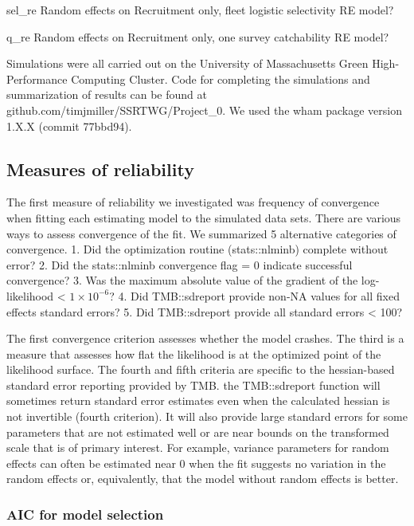 \documentclass[
  12pt,
]{article}
\begin{document}
sel\_re Random effects on Recruitment only, fleet logistic selectivity
RE model?

q\_re Random effects on Recruitment only, one survey catchability RE
model?

Simulations were all carried out on the University of Massachusetts
Green High-Performance Computing Cluster. Code for completing the
simulations and summarization of results can be found at
github.com/timjmiller/SSRTWG/Project\_0. We used the wham package
version 1.X.X (commit 77bbd94).

\hypertarget{measures-of-reliability}{%
\subsection*{Measures of reliability}\label{measures-of-reliability}}

The first measure of reliability we investigated was frequency of
convergence when fitting each estimating model to the simulated data
sets. There are various ways to assess convergence of the fit. We
summarized 5 alternative categories of convergence. 1. Did the
optimization routine (stats::nlminb) complete without error? 2. Did the
stats::nlminb convergence flag = 0 indicate successful convergence? 3.
Was the maximum absolute value of the gradient of the log-likelihood
\textless{} \(1\times10^{-6}\)? 4. Did TMB::sdreport provide non-NA
values for all fixed effects standard errors? 5. Did TMB::sdreport
provide all standard errors \textless{} 100?

The first convergence criterion assesses whether the model crashes. The
third is a measure that assesses how flat the likelihood is at the
optimized point of the likelihood surface. The fourth and fifth criteria
are specific to the hessian-based standard error reporting provided by
TMB. the TMB::sdreport function will sometimes return standard error
estimates even when the calculated hessian is not invertible (fourth
criterion). It will also provide large standard errors for some
parameters that are not estimated well or are near bounds on the
transformed scale that is of primary interest. For example, variance
parameters for random effects can often be estimated near 0 when the fit
suggests no variation in the random effects or, equivalently, that the
model without random effects is better.

\hypertarget{aic-for-model-selection}{%
\subsubsection*{AIC for model selection}\label{aic-for-model-selection}}
\end{document}
